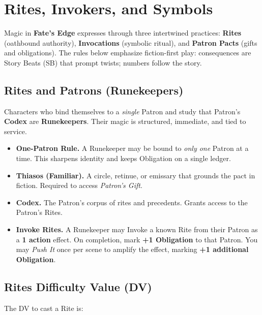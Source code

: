 
\section{Rites, Invokers, and Symbols}
\label{sec:rites}

Magic in \textbf{Fate's Edge} expresses through three intertwined practices: \textbf{Rites} (oathbound authority), \textbf{Invocations} (symbolic ritual), and \textbf{Patron Pacts} (gifts and obligations). The rules below emphasize fiction-first play: consequences are Story Beats (SB) that prompt twists; numbers follow the story.

\subsection{Rites and Patrons (Runekeepers)}
\label{subsec:runekeepers}
Characters who bind themselves to a \emph{single} Patron and study that Patron's \textbf{Codex} are \textbf{Runekeepers}. Their magic is structured, immediate, and tied to service.

\begin{itemize}
  \item \textbf{One-Patron Rule.} A Runekeeper may be bound to \emph{only one} Patron at a time. This sharpens identity and keeps Obligation on a single ledger.
  \item \textbf{Thiasos (Familiar).} A circle, retinue, or emissary that grounds the pact in fiction. Required to access \emph{Patron's Gift}.
  \item \textbf{Codex.} The Patron's corpus of rites and precedents. Grants access to the Patron's Rites.
  \item \textbf{Invoke Rites.} A Runekeeper may Invoke a known Rite from their Patron as a \textbf{1 action} effect. On completion, mark \textbf{+1 Obligation} to that Patron. You may \emph{Push It} once per scene to amplify the effect, marking \textbf{+1 additional Obligation}.
\end{itemize}

\subsection*{Rites Difficulty Value (DV)}

The DV to cast a Rite is:

